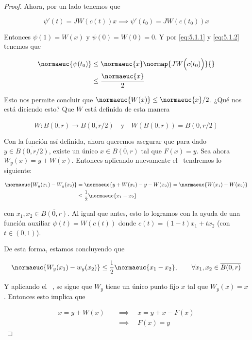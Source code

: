 \begin{proof}
    Ahora, por un lado tenemos que
    
    \[
    \psi'(t) = JW\left(c(t)\right)x \implies \psi'(t_0) = JW\left(c(t_0)\right)x
    \]
    
    Entonces $\psi(1) = W(x)$ y $\psi(0) = W(0) = 0$. Y por \ref{eq:5.1.1} y \ref{eq:5.1.2} tenemos que
    
    \begin{align*}
        \normaeuc{\psi(t_0)} &\leq \normaeuc{x}\normap{JW\Big( c(t_0) \Big)}{} \\
            &\leq \frac{\normaeuc{x}}{2}
    \end{align*}
    
    Esto nos permite concluir que $\normaeuc{W(x)} \leq \normaeuc{x}/2$. ¿Qué nos está diciendo esto? Que $W$ está definida de esta manera
    
    \[
    W: \overline{B(0,r)} \rightarrow \overline{B(0,r/2)} \quad \text{y} \quad W\left( B(0,r) \right) = B(0, r/2)
    \]
    
    Con la función así definida, ahora queremos asegurar que para dado $y \in \overline{B(0, r/2)}$, existe un único $x \in \overline{B(0,r)}$ tal que $F(x) = y$. Sea ahora $W_y(x) = y + W(x)$. Entonces aplicando nuevamente el \TVM~tendremos lo siguiente:
    
    \begin{align*}
        \normaeuc{W_y(x_1) - W_y(x_2)} &= \normaeuc{y + W(x_1) - y - W(x_2)} = \normaeuc{W(x_1) - W(x_2)} \\
            &\leq \frac{1}{2}\normaeuc{x_1 - x_2}
    \end{align*}
    
    \noindent con $x_1, x_2 \in \overline{B(0,r)}$. Al igual que antes, esto lo logramos con la ayuda de una función auxiliar $\psi(t) = W\left( c(t) \right)$ donde $c(t) = (1-t)x_1 + tx_2$ (con $t \in (0,1)$).
    
    De esta forma, estamos concluyendo que
    
    \[
    \normaeuc{W_y(x_1) - w_y(x_2)} \leq \frac{1}{2} \normaeuc{x_1 - x_2}, \qquad \forall x_1, x_2 \in \overline{B(0,r)}
    \]
    
    Y aplicando el \LC~, se sigue que $W_y$ tiene un único punto fijo $x$ tal que $W_y(x) = x$. Entonces esto implica que
    
    \begin{align}
        x = y + W(x) \quad &\implies \quad x = y + x - F(x) \\
            &\implies \quad F(x) = y
    \end{align}
    

\end{proof}
